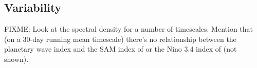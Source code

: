 \subsection{Variability}

FIXME: Look at the spectral density for a number of timescales. Mention that (on a 30-day running mean timescale) there's no relationship between the planetary wave index and the SAM index of \citet{Marshall2003} or the Nino 3.4 index of  (not shown). 